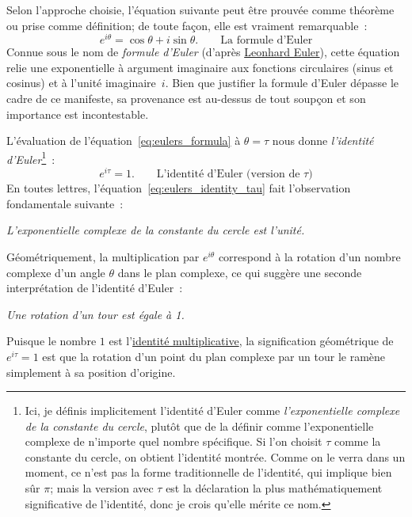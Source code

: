 Selon l'approche choisie, l'équation suivante peut être prouvée comme
théorème ou prise comme définition\ns; de toute façon, elle est vraiment remarquable~:
\begin{equation}
\label{eq:eulers_formula}
e^{i\theta} = \cos\theta + i\sin\theta. \qquad\mbox{La formule d'Euler}
\end{equation}
Connue sous le nom de \emph{formule d'Euler} (d'après
\href{https://en.wikipedia.org/wiki/Leonhard_Euler}{Leonhard Euler}), cette
équation relie une exponentielle à argument imaginaire aux fonctions circulaires
(sinus et cosinus) et à l'unité imaginaire~$i$. Bien que justifier la formule
d'Euler dépasse le cadre de ce manifeste, sa provenance est au-dessus de tout
soupçon et son importance est incontestable.

L'évaluation de l'équation~\eqref{eq:eulers_formula} à $\theta = \tau$ nous donne
\emph{l'identité d'Euler}\ns\footnote{Ici, je définis implicitement l'identité
d'Euler comme \emph{l'exponentielle complexe de la constante du cercle}, plutôt
que de la définir comme l'exponentielle complexe de n'importe quel nombre spécifique. Si l'on
choisit $\tau$ comme la constante du cercle, on obtient l'identité montrée.
Comme on le verra dans un moment, ce n'est pas la forme traditionnelle de l'identité,
qui implique bien sûr $\pi$\ns; mais la version avec $\tau$ est la déclaration
la plus mathématiquement significative de l'identité, donc je crois qu'elle
mérite ce nom.}~:
\begin{equation}
\label{eq:eulers_identity_tau}
e^{i\tau} = 1. \qquad\mbox{L'identité d'Euler (version de $\tau$)}
\end{equation}
En toutes lettres, l'équation~\eqref{eq:eulers_identity_tau} fait l'observation
fondamentale suivante~:

\begin{center}
\emph{L'exponentielle complexe de la constante du cercle est l'unité.}
\end{center}

Géométriquement, la multiplication par $e^{i\theta}$ correspond à la rotation
d'un nombre complexe d'un angle $\theta$ dans le plan complexe, ce qui suggère
une seconde interprétation de l'identité d'Euler~:

\begin{center}
\emph{Une rotation d'un tour est égale à 1.}
\end{center}

\noindent Puisque le nombre $1$ est
l'\href{https://fr.wikipedia.org/wiki/%C3%89l%C3%A9ment_neutre}{identité
multiplicative}, la signification géométrique de $e^{i\tau} = 1$ est que la
rotation d'un point du plan complexe par un tour le ramène simplement à sa
position d'origine.

